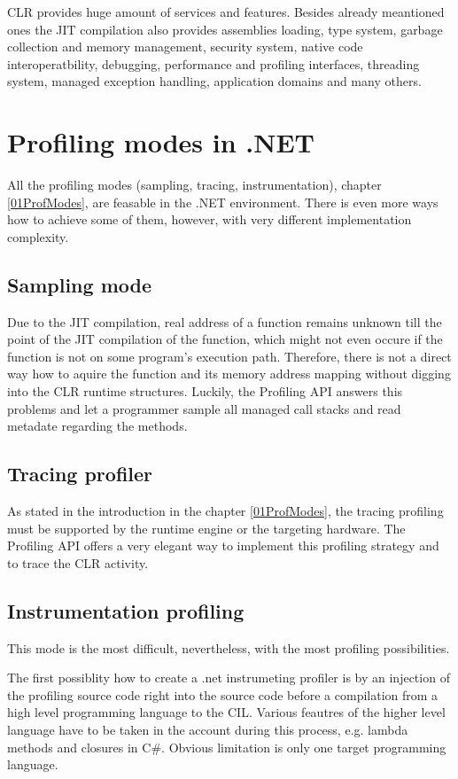 CLR provides huge amount of services and features. Besides already meantioned ones the JIT compilation also provides assemblies loading, type system, garbage collection and memory management, security system, native code interoperatbility, debugging, performance and profiling interfaces, threading system, managed exception handling, application domains and many others.

\section{Profiling modes in .NET}
All the profiling modes (sampling, tracing, instrumentation), chapter \ref{01ProfModes}, are feasable in the .NET environment. There is even more ways how to achieve some of them, however, with very different implementation complexity. 

\subsection{Sampling mode}
Due to the JIT compilation, real address of a function remains unknown till the point of the JIT compilation of the function, which might not even occure if the function is not on some program's execution path. Therefore, there is not a direct way how to aquire the function and its memory address mapping without digging into the CLR runtime structures. Luckily, the Profiling API answers this problems and let a programmer sample all managed call stacks and read metadate regarding the methods.

\subsection{Tracing profiler}
As stated in the introduction in the chapter \ref{01ProfModes}, the tracing profiling must be supported by the runtime engine or the targeting hardware. The Profiling API offers a very elegant way to implement this profiling strategy and to trace the CLR activity.

\subsection{Instrumentation profiling}
This mode is the most difficult, nevertheless, with the most profiling possibilities. 

The first possiblity how to create a .net instrumeting profiler is by an injection of the profiling source code right into the source code before a compilation from a high level programming language to the CIL. Various feautres of the higher level language have to be taken in the account during this process, e.g. lambda methods and closures in C\#. Obvious limitation is only one target programming language.

